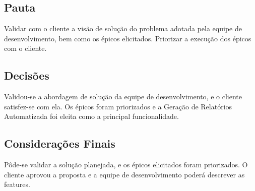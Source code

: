 \begin{apendicesenv}
\subsection{Pauta}
Validar com o cliente a visão de solução do problema adotada pela equipe de desenvolvimento, bem como os épicos elicitados. Priorizar a execução dos épicos com o cliente.

\subsection{Decisões}
Validou-se a abordagem de solução da equipe de desenvolvimento, e o cliente satisfez-se com ela. Os épicos foram priorizados e a Geração de Relatórios Automatizada foi eleita como a principal funcionalidade.

\subsection{Considerações Finais}
Pôde-se validar a solução planejada, e os épicos elicitados foram priorizados. O cliente aprovou a proposta e a equipe de desenvolvimento poderá descrever as features.

\end{apendicesenv}
